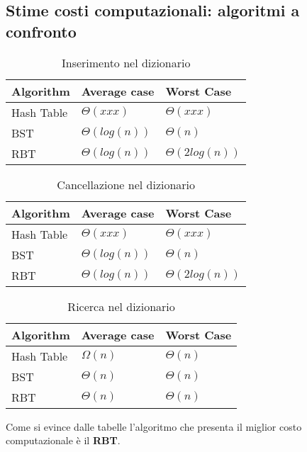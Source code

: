 \documentclass[paper=a4, fontsize=11pt,twoside]{scrartcl}   %
\begin{document}
			\subsection{Stime costi computazionali: algoritmi a confronto}				
				\begin{table}[ht]	
					\centering									
					\begin{tabular}{l | l | l}
						
						Algorithm & Average case & Worst Case \\
						\hline
						Hash Table & $\Theta(xxx)$ & $\Theta(xxx)$ \\
						\hline
						BST & $\Theta(log(n))$ & $\Theta(n)$ \\
						\hline
						RBT & $\Theta(log(n))$ & $\Theta(2log(n))$ \\
						\hline					
					\end{tabular}
					\caption{Inserimento nel dizionario} %
				\end{table}	
							
				\begin{table}[ht]
					\centering									
					\begin{tabular}{l | l | l}
						
						Algorithm & Average case & Worst Case \\
						\hline
						Hash Table & $\Theta(xxx)$ & $\Theta(xxx)$ \\
						\hline
						BST & $\Theta(log(n))$ & $\Theta(n)$ \\
						\hline
						RBT & $\Theta(log(n))$ & $\Theta(2log(n))$ \\
						\hline					
					\end{tabular}
					\caption{Cancellazione nel dizionario} %
				\end{table}
						
				\begin{table}[ht]
					\centering									
					\begin{tabular}{l | l | l}
						
						Algorithm & Average case & Worst Case \\
						\hline
						Hash Table & $\Omega(n)$ & $\Theta(n)$ \\
						\hline
						BST & $\Theta(n)$ & $\Theta(n)$ \\
						\hline
						RBT & $\Theta(n)$ & $\Theta(n)$ \\
						\hline					
					\end{tabular}
					\caption{Ricerca nel dizionario} %
				\end{table}
			 Come si evince dalle tabelle l'algoritmo che presenta il miglior costo computazionale è il \textbf{RBT}.
			 \pagebreak
			 
\end{document}
